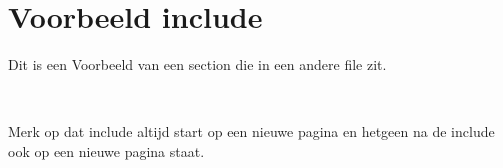 \section*{Voorbeeld include}
    Dit is een Voorbeeld van een section die in een andere file zit.

    \

    Merk op dat include altijd start op een nieuwe pagina en hetgeen na de include ook op een nieuwe pagina staat.
    \label{sec:exampleInclude1}
